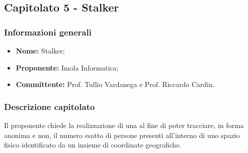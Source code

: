 \subsection{Capitolato 5 - Stalker}

	\subsubsection{Informazioni generali}
		\begin{itemize}
			\item \textbf{Nome:} Stalker;
			\item \textbf{Proponente:} Imola Informatica;
			\item \textbf{Committente: }Prof. Tullio Vardanega e Prof. Riccardo Cardin.
		\end{itemize}

	\subsubsection{Descrizione capitolato}
		Il proponente chiede la realizzazione di una  al fine di poter tracciare, in forma anonima e non, il numero esatto di persone presenti all'interno di uno spazio fisico identificato da un insieme di coordinate geografiche.

